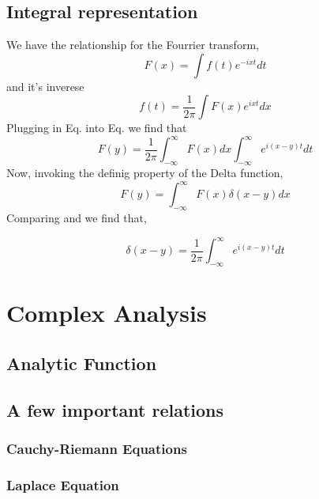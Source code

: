 \subsection{Integral representation}
We have the relationship for the Fourrier transform,
\begin{equation}
F(x) = \int f(t) e^{-ixt} dt
\end{equation}
and it's inverese
\begin{equation}
f(t) = \frac{1}{2 \pi} \int F(x) e^{ixt} dx
\end{equation}
Plugging in Eq. into Eq. we find that 
\begin{equation}
	F(y) = \frac{1}{2 \pi} \int_{-\infty}^{\infty} F(x) dx \int_{-\infty}^{\infty}e^{i(x-y)t} dt
\end{equation}	
Now, invoking the definig property of the Delta function,
\begin{equation}
F(y) = \int_{-\infty}^{\infty} F(x) \delta(x-y) dx
\end{equation}
Comparing and we find that,
\begin{tcolorbox}
\begin{equation}
\delta(x-y) = \frac{1}{2 \pi} \int_{-\infty}^{\infty} e^{i(x-y)t} dt
\end{equation}
\end{tcolorbox}
\section{Complex Analysis}
\subsection{Analytic Function}

\subsection{A few important relations}
\subsubsection{Cauchy-Riemann Equations}
\subsubsection{Laplace Equation}
